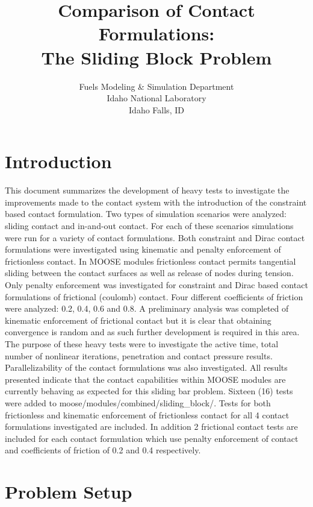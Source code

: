 \documentclass[]{article}
\begin{document}
\title{Comparison of Contact Formulations:\\
The Sliding Block Problem}

\author{Fuels Modeling \& Simulation Department\\
Idaho National Laboratory\\
Idaho Falls, ID}
\maketitle


\section{Introduction}
\label{introduction}
This document summarizes the development of heavy tests to investigate the improvements made to the contact system with the introduction of the constraint based contact formulation.  Two types of simulation scenarios were analyzed: sliding contact and in-and-out contact.  For each of these scenarios simulations were run for a variety of contact formulations.  Both constraint and Dirac contact formulations were investigated using kinematic and penalty enforcement of frictionless contact.  In MOOSE modules frictionless contact permits tangential sliding between the contact surfaces as well as release of nodes during tension.  Only penalty enforcement was investigated for constraint and Dirac based contact formulations of frictional (coulomb) contact.  Four different coefficients of friction were analyzed: 0.2, 0.4, 0.6 and 0.8.  A preliminary analysis was completed of kinematic enforcement of frictional contact but it is clear that obtaining convergence is random and as such further development is required in this area.  The purpose of these heavy tests were to investigate the active time, total number of nonlinear iterations, penetration and contact pressure results.  Parallelizability of the contact formulations was also investigated.  All results presented indicate that the contact capabilities within MOOSE modules are currently behaving as expected for this sliding bar problem.  Sixteen (16) tests were added to moose/modules/combined/sliding\_block/.  Tests for both frictionless and kinematic enforcement of frictionless contact for all 4 contact formulations investigated are included.  In addition 2 frictional contact tests are included for each contact formulation which use penalty enforcement of contact and coefficients of friction of 0.2 and 0.4 respectively.

\section{Problem Setup}
\label{problem_setup}
\end{document}
